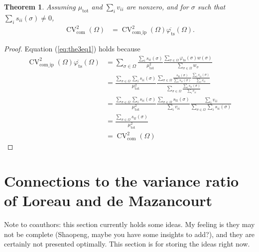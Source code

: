\documentclass[letterpaper,11pt]{article}
\newcommand{\CV}{{\operatorname{CV}}}
\newcommand{\com}{{\operatorname{com}}}
\newcommand{\comip}{{\operatorname{com\_ip}}}
\newtheorem{theorem}{Theorem}[]
\begin{document}
\begin{theorem}\label{thm:range}
Assuming $\mu_{\text{tot}}$ and $\sum_i v_{ii}$ are nonzero, and for $\sigma$ such
that $\sum_i s_{ii}(\sigma) \neq 0$,
\begin{align}
\CV_{\com}^2(\Omega) &= \CV_{\comip}^2(\Omega)  \overline{\varphi_{\text{ts}}}(\Omega) . \label{eq:the3eq1}
\end{align}
\end{theorem}
\begin{proof}
Equation (\ref{eq:the3eq1}) holds because
\begin{align}
\CV_{\comip}^2(\Omega)  \overline{\varphi_{\text{ts}}}(\Omega) 
&= \sum_{\sigma \in \Omega} \frac{\sum_i s_{ii}(\sigma)}{\mu_{\text{tot}}^2}  \frac{\sum_{\sigma \in \Omega} \varphi_{\text{ts}}(\sigma) w(\sigma)}{\sum_{\sigma \in \Omega} w_{\sigma}}  \\
&= \frac{\sum_{\sigma \in \Omega} \sum_i s_{ii}(\sigma)}{\mu_{\text{tot}}^2} \frac{\sum_{\sigma \in \Omega} \frac{s_{\text{tt}}(\sigma)}{\sum_i s_{ii}(\sigma)} \frac{\sum_i s_{ii}(\sigma)}{\sum_i v_{ii}}}{\sum_{\sigma \in \Omega} \frac{\sum_i s_{ii}(\sigma)}{\sum_i v_{ii}}} \\
&= \frac{\sum_{\sigma \in \Omega} \sum_i s_{ii}(\sigma)}{\mu_{\text{tot}}^2} \frac{\sum_{\sigma \in \Omega} s_{\text{tt}}(\sigma)}{\sum_i v_{ii}} \frac{\sum_i v_{ii}}{\sum_{\sigma \in \Omega} \sum_i s_{ii}(\sigma)} \\
&= \frac{\sum_{\sigma \in \Omega} s_{tt}(\sigma)}{\mu_{\text{tot}}^2} \\
&= \CV_{\com}^2(\Omega)
\end{align}
\end{proof}

\section{Connections to the variance ratio of Loreau and de Mazancourt}
\noindent Note to coauthors: this section currently holds some ideas.
My feeling is they may not be complete (Shaopeng, maybe you have some insights
to add?), and they are certainly not presented optimally. This section is
for storing the ideas right now.
\end{document}
